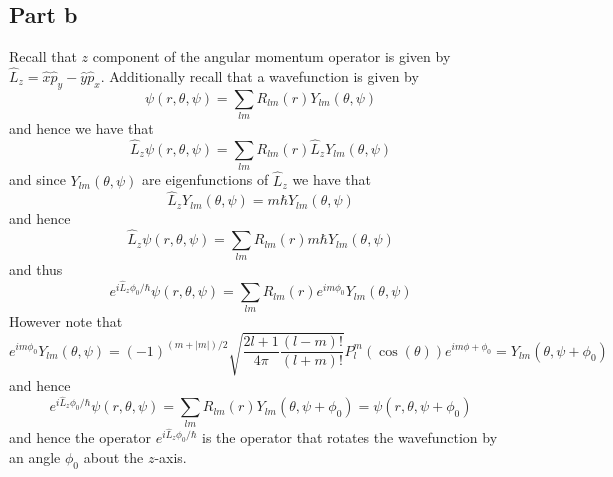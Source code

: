 \documentclass[12pt]{report}
\begin{document}
\subsection*{Part b}
Recall that $z$ component of the angular momentum operator is given by $\hat{L}_z = \hat{x}\hat{p}_y - \hat{y}\hat{p}_x$. Additionally recall that a wavefunction 
is given by
\begin{equation*}
  \psi(r,\theta,\psi) = \sum_{lm}R_{lm}(r)Y_{lm}(\theta,\psi)
\end{equation*}
and hence we have that
\begin{equation*}
  \hat{L}_z\psi(r,\theta,\psi) = \sum_{lm}R_{lm}(r)\hat{L}_zY_{lm}(\theta,\psi)
\end{equation*}
and since $Y_{lm}(\theta,\psi)$ are eigenfunctions of $\hat{L}_z$ we have that
\begin{equation*}
  \hat{L}_zY_{lm}(\theta,\psi) = m\hbar Y_{lm}(\theta,\psi)
\end{equation*}
and hence
\begin{equation*}
  \hat{L}_z\psi(r,\theta,\psi) = \sum_{lm}R_{lm}(r)m\hbar Y_{lm}(\theta,\psi)
\end{equation*}
and thus
\begin{equation*}
  e^{i\hat{L}_z\phi_0/\hbar}\psi(r,\theta,\psi) = \sum_{lm}R_{lm}(r)e^{im\phi_0}Y_{lm}(\theta,\psi)
\end{equation*}
However note that
\begin{equation}
  e^{im\phi_0} Y_{lm}(\theta,\psi) = (-1)^{(m+|m|)/2}\sqrt{\frac{2l + 1}{4\pi}\frac{(l-m)!}{(l+m)!}}P_l^m(\cos(\theta))e^{im\phi + \phi_0} = Y_{lm}(\theta,\psi + \phi_0)
\end{equation}
and hence
\begin{equation*}
  e^{i\hat{L}_z\phi_0/\hbar}\psi(r,\theta,\psi) = \sum_{lm}R_{lm}(r)Y_{lm}(\theta,\psi + \phi_0) = \psi(r,\theta,\psi + \phi_0)
\end{equation*}
and hence the operator $e^{i\hat{L}_z\phi_0/\hbar}$ is the operator that rotates the wavefunction by an angle $\phi_0$ about the $z$-axis.
\end{document}
